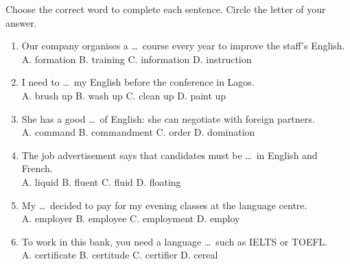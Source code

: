 \documentclass[11pt]{article}
\begin{document}
\begin{exercice}
Choose the correct word to complete each sentence. Circle the letter of your answer.
\begin{enumerate}
\item Our company organises a \ldots\ course every year to improve the staff's English.\\
A. formation \hspace{0.5cm} B. training \hspace{0.5cm} C. information \hspace{0.5cm} D. instruction
\item I need to \ldots\ my English before the conference in Lagos.\\
A. brush up \hspace{0.5cm} B. wash up \hspace{0.5cm} C. clean up \hspace{0.5cm} D. paint up
\item She has a good \ldots\ of English: she can negotiate with foreign partners.\\
A. command \hspace{0.5cm} B. commandment \hspace{0.5cm} C. order \hspace{0.5cm} D. domination
\item The job advertisement says that candidates must be \ldots\ in English and French.\\
A. liquid \hspace{0.5cm} B. fluent \hspace{0.5cm} C. fluid \hspace{0.5cm} D. floating
\item My \ldots\ decided to pay for my evening classes at the language centre.\\
A. employer \hspace{0.5cm} B. employee \hspace{0.5cm} C. employment \hspace{0.5cm} D. employ
\item To work in this bank, you need a language \ldots\ such as IELTS or TOEFL.\\
A. certificate \hspace{0.5cm} B. certitude \hspace{0.5cm} C. certifier \hspace{0.5cm} D. cereal
\end{enumerate}
\end{exercice}
\end{document}
